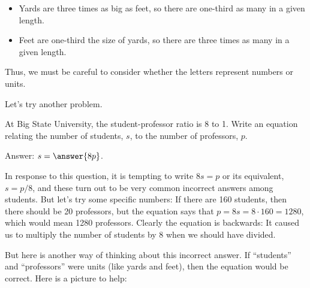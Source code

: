 \documentclass[nooutcomes]{ximera}
\begin{document}
\begin{itemize}
\item Yards are three times as big as feet, so there are one-third as many in a given length.  
\item Feet are one-third the size of yards, so there are three times as many in a given length.  
\end{itemize}

Thus, we must be careful to consider whether the letters represent numbers or units.  

Let's try another problem.  

\begin{question}
At Big State University, the student-professor ratio is 8 to 1.  Write an equation relating the number of students, $s$, to the number of professors, $p$.  

Answer:  $s = \answer{8p}$.  
\end{question}

In response to this question, it is tempting to write $8s = p$ or its equivalent, $s=p/8$, and these turn out to be very common incorrect answers among students.  But let's try some specific numbers:  If there are 160 students, then there should be 20 professors, but the equation says that $p = 8s = 8\cdot 160 = 1280$, which would mean 1280 professors.  Clearly the equation is backwards: It caused us to multiply the number of students by 8 when we should have divided.  

But here is another way of thinking about this incorrect answer.  If ``students'' and ``professors'' were units (like yards and feet), then the equation would be correct. Here is a picture to help:  

\begin{image}
\end{image}
\end{document}

